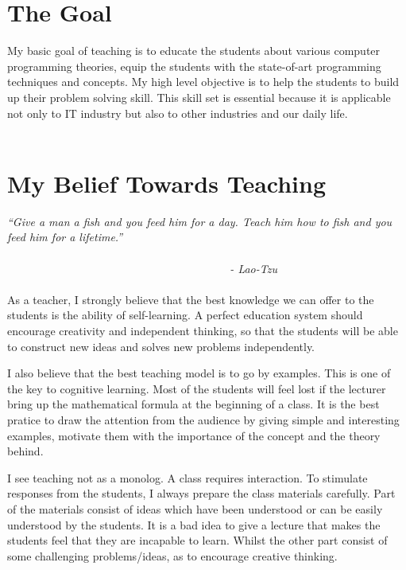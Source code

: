 \documentclass[12pt]{article}
\theoremstyle{plain} \numberwithin{equation}{section}
\theoremstyle{definition}
\begin{document}
\raisebox{1cm}

\section{The Goal}
My basic goal of teaching is to educate the students about
various computer programming theories, equip the students with 
the state-of-art programming techniques and concepts.
My high level objective is to help the students to build up
their problem solving skill. 
This skill set is essential because it is applicable not only to 
IT industry but also to other industries and our daily life. 
\\ \\

\section{My Belief Towards Teaching}
{\em  
``Give a man a fish and you feed him for a day. Teach him how to 
fish and you feed him for a lifetime.''
} \\ \\
{\em
$~~~~~~~~~~~~~~~~~~~~~~~~~~~~~~~~~~~~~~~~~~~~~~~~~~~~~~~~~~~~~~~~~
~~~~~~~~~~~~~~~~~~~~~~~~$ - Lao-Tzu
}
\\ \\
As a teacher, I strongly believe that the best knowledge we can offer
to the students is the ability of self-learning. 
A perfect education system should encourage creativity and independent 
thinking, so that the students will be able to construct 
new ideas and solves new problems independently.


I also believe that the best teaching model is to go by examples.
This is one of the key to cognitive learning. Most of the students will
feel lost if the lecturer bring up the mathematical formula
at the beginning of a class. It is the best pratice to draw the attention
from the audience by giving simple and interesting examples, motivate them with 
the importance of the concept and the theory behind.

I see teaching not as a monolog. A class requires interaction. To stimulate 
responses from the students, I always prepare the class materials 
carefully. Part of the materials consist of ideas which have been
understood or can be easily understood by the students. 
It is a bad idea to give a lecture that makes the students feel that
they are incapable to learn.
Whilst the other part consist of some challenging problems/ideas,
as to encourage creative thinking.
\end{document}

